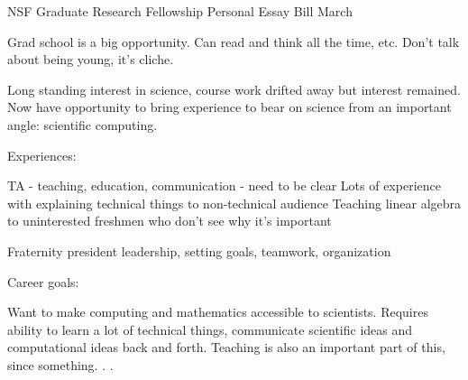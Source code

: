 \documentclass[twoside,leqno, 12pt]{article}
\date{}
\begin{document}
\begin{center}
\LARGE{NSF Graduate Research Fellowship Personal Essay} \newline
\Large{Bill March}
\end{center}



Grad school is a big opportunity.  Can read and think all the time, etc.  Don't talk about being young, it's cliche.  

Long standing interest in science, course work drifted away but interest remained.  Now have opportunity to bring experience to bear on science from an important angle: scientific computing.  


Experiences:

TA - teaching, education, communication - need to be clear
	Lots of experience with explaining technical things to non-technical audience
	Teaching linear algebra to uninterested freshmen who don't see why it's important
	
Fraternity president
	leadership, setting goals, teamwork, organization
	



Career goals:

Want to make computing and mathematics accessible to scientists.  Requires ability to learn a lot of technical things, communicate scientific ideas and computational ideas back and forth.  
Teaching is also an important part of this, since something. . .











\end{document}
